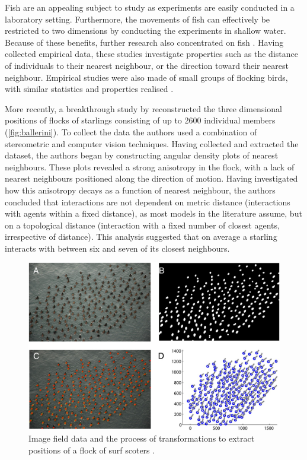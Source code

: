 Fish are an appealing subject to study as experiments are easily conducted in a laboratory setting. 
Furthermore, the movements of fish can effectively be restricted to two dimensions by conducting the 
experiments in shallow water. Because of these benefits, further research also concentrated on fish 
\parencite{partridge80, van_long85}. Having collected empirical data, these studies investigate 
properties such as the distance of individuals to their nearest neighbour, or the direction toward 
their nearest neighbour. Empirical studies were also made of small groups of flocking birds, with 
similar statistics and properties realised \parencite{major78, budgey98}.

More recently, a breakthrough study by \textcite{ballerini08} reconstructed the three dimensional 
positions of flocks of starlings consisting of up to 2600 individual members (\cref{fig:ballerini}). 
To collect the data the authors used a combination of stereometric and computer vision techniques. 
Having collected and extracted the dataset, the authors began by constructing angular density plots 
of nearest neighbours. These plots revealed a strong anisotropy in the flock, with a lack of nearest 
neighbours positioned along the direction of motion. Having investigated how this anisotropy decays 
as a function of nearest neighbour, the authors concluded that interactions are not dependent on 
metric distance (interactions with agents within a fixed distance), as most models in the literature 
assume, but on a topological distance (interaction with a fixed number of closest agents, 
irrespective of distance). This analysis suggested that on average a starling interacts with between 
six and seven of its closest neighbours.

\begin{figure}[t]
	\includegraphics[width=\textwidth]{lukeman_data.jpg}
	\caption{Image field data and the process of transformations to extract positions of a flock of surf 
scoters \parencite{lukeman10}.}
	\label{fig:lukeman_extraction}
\end{figure}

